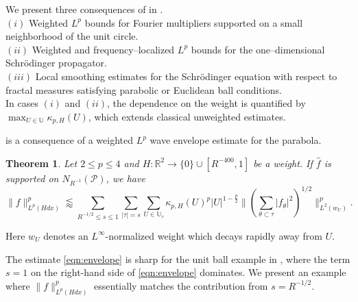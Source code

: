\documentclass[11pt]{amsart}
\newtheorem{theorem}{Theorem}[section]
\theoremstyle{definition}
\theoremstyle{remark}
\newcommand{\R}{\mathbb{R}}
\newcommand{\cP}{\mathcal{P}}
\newcommand{\U}{\mathbb{U}}
\newcommand{\less}{\lessapprox}
\begin{document}
We present three consequences of  in .\\[1ex]
$(i)$ Weighted $L^p$ bounds for Fourier multipliers supported on a small neighborhood of the unit circle.\\[1ex]
$(ii)$ Weighted and frequency–localized $L^p$ bounds for the one–dimensional Schr\"odinger propagator.\\[1ex]
$(iii)$ Local smoothing estimates for the Schr\"{o}dinger equation with respect to fractal measures 
satisfying parabolic or Euclidean ball conditions. \\[1ex]
In cases $(i)$ and $(ii)$, the dependence on the weight is quantified by $\max_{U\in\U}\kappa_{p,H}(U)$, which extends classical unweighted estimates.

 is a consequence of a weighted $L^p$ wave envelope estimate for the parabola.
\begin{theorem}\label{thm:sqweighted}
	Let $2\leq p\leq 4$ and $H:\R^2 \to \{0\} \cup [R^{-400}, 1]$ be a weight. If $\widehat f$ is supported on $N_{R^{-1}} (\cP)$, we have  
\begin{equation}\label{eqn:envelope}
	\| f \|_{L^p(Hd x)}^p \less  \sum_{R^{-1/2} \leq s\leq 1} \sum_{|\tau|=s} \sum_{U\in \U_{\tau}} \kappa_{p,H}(U)^p |U|^{1-\frac{p}{2}} \big\| (\sum_{\theta \subset \tau} |f_{\theta}|^2 )^{1/2}  \big\|_{L^2(w_{U})}^p.
\end{equation}    
\end{theorem}
Here $w_U$ denotes an $L^\infty$-normalized weight which decays rapidly away from $U$. 

The estimate \eqref{eqn:envelope} is sharp for the unit ball example in , where the term $s=1$ on the right-hand side of \eqref{eqn:envelope} dominates. We present an example where $\|f\|_{L^p(Hdx)}^p$ essentially matches the contribution from $s = R^{-1/2}$.
\end{document}
